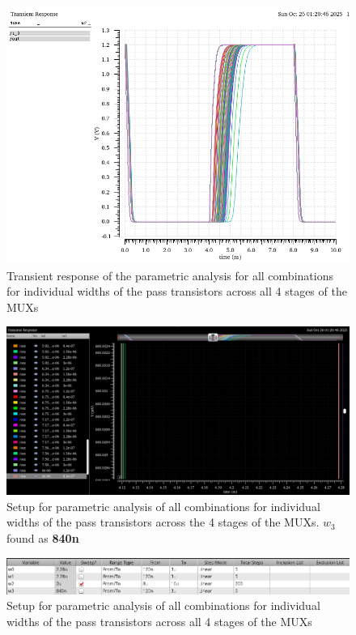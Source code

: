 \documentclass[12pt]{article}
\begin{document}
\begin{figure}[H]
    \centering
    \includegraphics[width=0.5\linewidth]{writeup//figures/wmux_2_parametric_sweep.png}
    \caption{Transient response of the parametric analysis for all combinations for individual widths of the pass transistors across all 4 stages of the MUXs}
\end{figure}

\begin{figure}[H]
    \centering
    \includegraphics[width=\linewidth]{writeup//figures/wmux_2_parametrics_weep.png}
    \caption{Setup for parametric analysis of all combinations for individual widths of the pass transistors across the 4 stages of the MUXs. $w_3$ found as \textbf{840n}}
\end{figure}

\begin{figure}[H]
    \centering
    \includegraphics[width=0.5\linewidth]{writeup//figures/wmux_1_parametric_sweep_setup.png}
    \caption{Setup for parametric analysis of all combinations for individual widths of the pass transistors across all 4 stages of the MUXs}
\end{figure}
\end{document}
